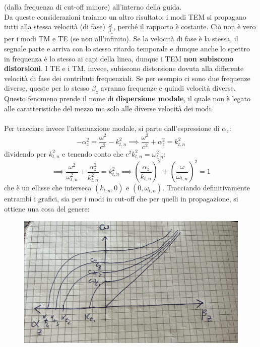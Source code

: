 \documentclass{book}
\begin{document}
    (dalla frequenza di cut-off minore) all'interno della guida.  \\
    Da queste considerazioni traiamo un altro risultato: i modi TEM si propagano tutti alla stessa velocità (di fase) $\displaystyle \frac{\omega}{\beta_{z}}$,
    perché il rapporto è costante. Ciò non è vero per i modi TM e TE (se non all'infinito). Se la velocità di fase è la stessa, il segnale parte e arriva 
    con lo stesso ritardo temporale e dunque anche lo spettro in frequenza è lo stesso ai capi della linea, dunque i TEM \textbf{non subiscono distorsioni}.
    I TE e i TM, invece, subiscono distorsione dovuta alla differente velocità di fase dei contributi frequenziali. Se per esempio ci sono due frequenze diverse, queste per 
    lo stesso $\beta_{z}$ avranno frequenze e quindi velocità diverse. Questo fenomeno prende il nome di \textbf{dispersione modale}, il quale non è legato alle caratteristiche
    del mezzo ma solo alle diverse velocità dei modi. \\ \\
    Per tracciare invece l'attenuazione modale, si parte dall'espressione di $\alpha_{z}$:
    \begin{equation}
        -\alpha_{z} ^{2} = \frac{\omega ^{2}}{c^{2}}-k_{t,n} ^{2} \implies \frac{\omega ^{2}}{c^{2}}+\alpha_{z} ^{2} = k_{t,n} ^{2}
    \end{equation}
    dividendo per $k_{t,n} ^{2}$ e tenendo conto che $c^{2}k_{t,n} ^{2} = \omega_{t,n} ^{2}$:
    \begin{equation}
        \implies \frac{\omega ^{2}}{\omega_{t,n} ^{2}}+\frac{\alpha_{z} ^{2}}{k_{t,n} ^{2}}=k_{t,n} ^{2} \implies (\frac{\alpha_{z}}{k_{t,n}})^{2}+(\frac{\omega}{\omega_{t,n}})^{2} = 1
    \end{equation}
    che è un ellisse che interseca $(k_{t,n},0)$ e $(0, \omega_{t,n})$. Tracciando definitivamente entrambi i grafici, sia per i modi 
    in cut-off che per quelli in propagazione, si ottiene una cosa del genere:
    \begin{figure}[h!]
        \center  
        \includegraphics[width=0.7\linewidth]{img/Chapter_three/Chapt3img1.png}
    \end{figure}
\end{document}
